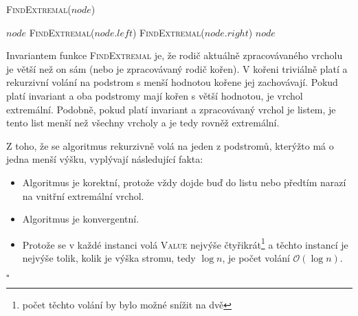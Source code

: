 \documentclass[12pt]{article}
\renewcommand{\O}{\mathcal{O}}
\begin{document}
\begin{algorithm}
\textsc{FindExtremal}($node$)
\begin{algorithmic}
\RETURN $node$
\RETURN \textsc{FindExtremal}($node.left$)
\RETURN \textsc{FindExtremal}($node.right$)
\ELSE
\RETURN $node$
\ENDIF
\end{algorithmic}
\end{algorithm}

Invariantem funkce \textsc{FindExtremal} je, že rodič aktuálně zpracovávaného vrcholu je větší než
on sám (nebo je zpracovávaný rodič kořen). V kořeni triviálně platí a rekurzivní volání na podstrom
s menší hodnotou kořene jej zachovávají. Pokud platí invariant a oba podstromy mají kořen s větší
hodnotou, je vrchol extremální. Podobně, pokud platí invariant a zpracovávaný vrchol je listem, je
tento list menší než všechny vrcholy a je tedy rovněž extremální.

Z toho, že se algoritmus rekurzivně volá na jeden z podstromů, kterýžto má o jedna menší výšku,
vyplývají následující fakta:

\begin{itemize}
\item Algoritmus je korektní, protože vždy dojde buď do listu nebo předtím narazí na vnitřní
extremální vrchol.
\item Algoritmus je konvergentní.
\item Protože se v každé instanci volá \textsc{Value} nejvýše čtyřikrát\footnote{počet těchto volání
by bylo možné snížit na dvě} a těchto instancí je nejvýše tolik, kolik je výška stromu, tedy $\log
n$, je počet volání $\O(\log n)$.
\end{itemize}

\hfill$\square$
\end{document}
